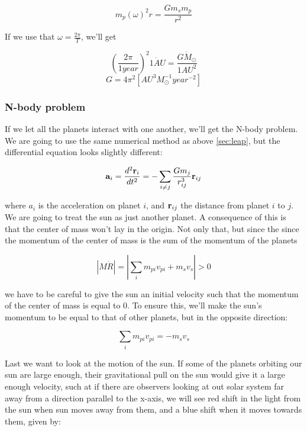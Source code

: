 \documentclass[a4paper, 10pt]{article}
\begin{document}
\begin{equation}
m_p(\omega)^{2}r = \frac{Gm_sm_p}{r^{2}}
\end{equation}

If we use that $\omega = \frac{2 \pi}{T}$, we'll get

\begin{equation}
\left( \frac{2 \pi}{1 year} \right)^{2} \dot {1 AU} = \frac{G \dot M_{\odot}}{1AU^{2}} 
\end{equation}
\begin{equation}
G = 4 \pi^{2}[AU^{3} M_{\odot}^{-1} year^{-2}]
\end{equation}

\subsubsection{N-body problem}
If we let all the planets interact with one another, we'll get the N-body problem. We are going to use the same numerical method as above \ref{sec:leap}, but the differential equation looks slightly different:

\begin{align}
\bold{a}_i = \frac{d^{2}\textbf{r}_i}{dt^{2}}  = -\sum_{i \neq j}\frac{G m_j}{r_{ij}^{3}}\textbf{r}_{ij}
\end{align}

where $a_i$ is the acceleration on planet $i$, and $\bold{r}_{ij}$ the distance from planet $i$ to $j$. We are going to treat the sun as just another planet. A consequence of this is that the center of mass won't lay in the origin. Not only that, but since the since the momentum of the center of mass is the sum of the momentum of the planets 

\begin{equation}
|M\dot{R}| = |\sum\limits_i m_{pi}v_{pi} + m_sv_s| > 0 
\end{equation}

we have to be careful to give the sun an initial velocity such that the momentum of the center of mass is equal to 0. To ensure this, we'll make the sun's momentum to be equal to that of other planets, but in the opposite direction:

\begin{equation}
\sum\limits_i m_{pi}v_{pi} = -m_sv_s
\end{equation}

Last we want to look at the motion of the sun. If some of the planets orbiting our sun are large enough, their gravitational pull on the sun would give it a large enough velocity, such at if there are observers looking at out solar system far away from a direction parallel to the x-axis, we will see red shift in the light from the sun when sun moves away from them, and a blue shift when it moves towards them, given by:
\end{document}
